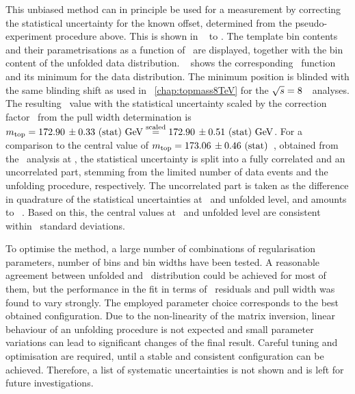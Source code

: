 This unbiased method can in principle be used for a measurement by correcting the statistical uncertainty for the known offset, determined from the pseudo-experiment procedure above.
%
This is shown in ~ to . The template bin contents and their parametrisations as a function of \mt\ are displayed, together with the bin content of the unfolded data distribution. \Fig~ shows the corresponding \chiq\ function and its minimum for the data distribution. 
%
The minimum position is blinded with the same blinding shift as used in \chap~\ref{chap:topmass8TeV} for the ${\sqrt{s}}=8$~\TeV\ analyses. The resulting \mt\ value with the statistical uncertainty scaled by the correction factor \UnfStatScaleFac\ from the pull width determination is $m_{\mathrm{top}}=172.90\,\pm 0.33~\mathrm{(stat)}~\mathrm{GeV}\stackrel{\mathrm{scaled}}{=}172.90\,\pm 0.51~\mathrm{(stat)}~\mathrm{GeV}$.
%
For a comparison to the central value of $m_{\mathrm{top}}=173.06\,\pm 0.46~\mathrm{(stat)}$~\GeV, obtained from the \cutbased\ analysis at \recolevel, the statistical uncertainty is split into a fully correlated and an uncorrelated part, stemming from the limited number of data events and the unfolding procedure, respectively.
%
The uncorrelated part is taken as the difference in quadrature of the statistical uncertainties at \recol\ and unfolded level, and amounts to \UnfStatUnfPart~\GeV. Based on this, the central values at \recol\ and unfolded level are consistent within \DiffSignUnfReco\ standard deviations.
%











To optimise the method, a large number of combinations of regularisation parameters, number of bins and bin widths have been tested. A reasonable agreement between unfolded and \truelevel\ distribution could be achieved for most of them, but the performance in the fit in terms of \mt\ residuals and pull width was found to vary strongly. 
%
The employed parameter choice corresponds to the best obtained configuration.
%
Due to the non-linearity of the matrix inversion, linear behaviour of an unfolding procedure is not expected and small parameter variations can lead to significant changes of the final result. Careful tuning and optimisation are required, until a stable and consistent configuration can be achieved.  
%
Therefore, a list of systematic uncertainties is not shown and is left for future investigations. 





